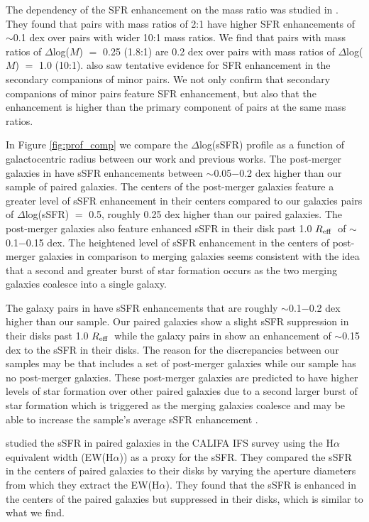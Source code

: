 \documentclass[iop,revtex4,twocolumn,apj,numberedappendix,appendixfloats]{emulateapj}
\newcommand{\reff}{$R_{\rm eff}$}
\newcommand{\ewha}{EW(H$\alpha$)}
\begin{document}
The dependency of the SFR enhancement on the mass ratio was studied in \citet{Ellison:2008}. They found that pairs with mass ratios of 2:1 have higher SFR enhancements of $\sim$0.1 dex over pairs with wider 10:1 mass ratios. We find that pairs with mass ratios of $\Delta$log($M$) $=$ 0.25 (1.8:1) are 0.2 dex over pairs with mass ratios of $\Delta$log($M$) $=$ 1.0 (10:1). \citet{Ellison:2008} also saw tentative evidence for SFR enhancement in the secondary companions of minor pairs. We not only confirm that secondary companions of minor pairs feature SFR enhancement, but also that the enhancement is higher than the primary component of pairs at the same mass ratios. 

In Figure \ref{fig:prof_comp} we compare the $\Delta$log(sSFR) profile as a function of galactocentric radius between our work and previous works. The post-merger galaxies in \citet{Thorp:2019} have sSFR enhancements between $\sim$0.05$-$0.2 dex higher than our sample of paired galaxies. The centers of the post-merger galaxies feature a greater level of sSFR enhancement in their centers compared to our galaxies pairs of $\Delta$log(sSFR) $=$ 0.5, roughly 0.25 dex higher than our paired galaxies. The post-merger galaxies also feature enhanced sSFR in their disk past 1.0 \reff\ of $\sim$0.1$-$0.15 dex. The heightened level of sSFR enhancement in the centers of post-merger galaxies in comparison to merging galaxies seems consistent with the idea that a second and greater burst of star formation occurs as the two merging galaxies coalesce into a single galaxy. 

The galaxy pairs in \citet{Pan:2019} have sSFR enhancements that are roughly $\sim$0.1$-$0.2 dex higher than our sample. Our paired galaxies show a slight sSFR suppression in their disks past 1.0 \reff\ while the galaxy pairs in \citet{Pan:2019} show an enhancement of $\sim$0.15 dex to the sSFR in their disks. The reason for the discrepancies between our samples may be that \citet{Pan:2019} includes a set of post-merger galaxies while our sample has no post-merger galaxies. These post-merger galaxies are predicted to have higher levels of star formation over other paired galaxies due to a second larger burst of star formation which is triggered as the merging galaxies coalesce and may be able to increase the sample's average sSFR enhancement . 

\citet{Barrera-Ballesteros:2015} studied the sSFR in paired galaxies in the CALIFA IFS survey using the H$\alpha$ equivalent width (\ewha) as a proxy for the sSFR. They compared the sSFR in the centers of paired galaxies to their disks by varying the aperture diameters from which they extract the \ewha. They found that the sSFR is enhanced in the centers of the paired galaxies but suppressed in their disks, which is similar to what we find.  
\end{document}
